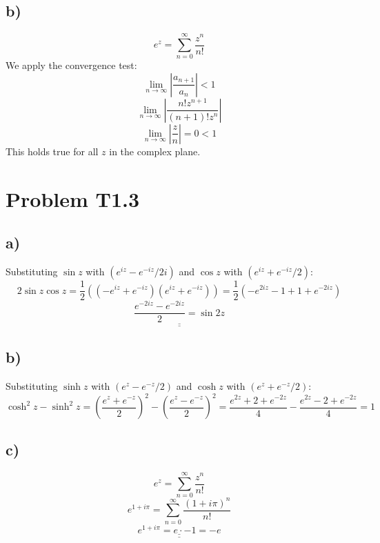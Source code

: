 \documentclass{article}
\begin{document}
\subsection*{b)}
\[
e^{z} = \sum_{n=0}^{\infty} \frac{z^n}{n!}
\]
We apply the convergence test: 
\[
\lim_{n \to ∞} \left|\frac{a_{n+1}}{a_n}\right| < 1
\]
\[
\lim_{n \to ∞} \left|\frac{n! z^{n+1}}{(n+1)! z^{n}}\right| 
\]
\[
\lim_{n \to ∞} \left|\frac{z}{n}\right| = 0 < 1 
\]
This holds true for all $z$ in the complex plane. 


\section*{Problem T1.3}
\subsection*{a)}
Substituting $\sin z$ with $(e^{iz} - e^{-iz} / 2i)$ and $\cos z$ with $(e^{iz} + e^{-iz} / 2)$:
\[
2 \sin z \cos z = \frac{1}{2} \left((-e^{iz} + e^{-iz})  (e^{iz} + e^{-iz})\right) = \frac{1}{2} \left(-e^{2iz} -1 + 1 + e^{-2iz}\right)
\]
\[
\underline{\underline{\frac{e^{-2iz} - e^{-2iz}}{2} = \sin 2z}}
\]

\subsection*{b)}
Substituting $\sinh z$ with $(e^{z} - e^{-z} / 2)$ and $\cosh z$ with $(e^{z} + e^{-z} / 2)$:
\[
\cosh^2 z - \sinh^2 z = \left(\frac{e^{z} + e^{-z}}{2}\right)^2 - \left(\frac{e^{z} - e^{-z}}{2}\right)^2 = \frac{e^{2z} + 2 + e^{-2z}}{4} - \frac{e^{2z} - 2 + e^{-2z}}{4} = 1
\]

\subsection*{c)}
\[
e^{z} = ∑_{n=0}^{∞} \frac{z^{n}}{n!}
\]
\[
e^{1+iπ} = ∑_{n=0}^{∞} \frac{(1 + iπ)^{n}}{n!}
\]
\[
\underline{\underline{e^{1 + iπ} = e ⋅ -1 = -e}}
\]
\end{document}
